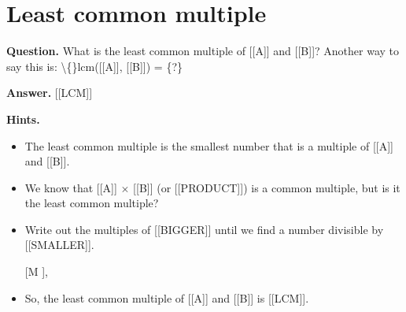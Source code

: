 \documentclass{article}
\begin{document}
\section*{Least common multiple}
\textbf{Question.} What is the least common multiple of [[A]] and [[B]]?
                    Another way to say this is:
                    \textbackslash\{\}lcm([[A]], [[B]]) = \{?\}

\textbf{Answer.} [[LCM]]

\textbf{Hints.}
\begin{itemize}
  \item The least common multiple is the smallest number that is a multiple of [[A]] and [[B]].
  \item We know that [[A]] $\times$ [[B]] (or [[PRODUCT]]) is a common multiple,
                but is it the least common multiple?
  \item Write out the multiples of [[BIGGER]] until we find a number divisible by [[SMALLER]].
  \item [[M]],
  \item So, the least common multiple of [[A]] and [[B]] is [[LCM]].
\end{itemize}
\end{document}
